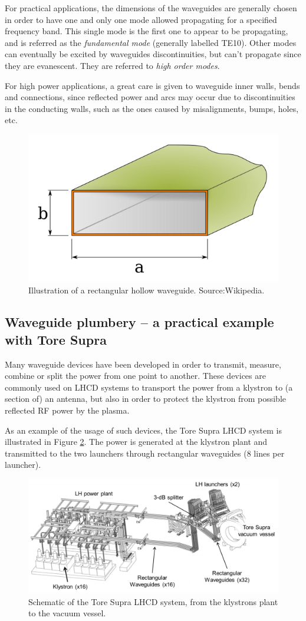 For practical applications, the dimensions of the waveguides are generally chosen in order to have one and only one mode allowed propagating for a specified frequency band. This single mode is the first one to appear to be propagating, and is referred as the \textit{fundamental mode} (generally labelled TE10). Other modes can eventually be excited by waveguides discontinuities, but can’t propagate since they are evanescent. They are referred to \textit{high order modes}.

For high power applications, a great care is given to waveguide inner walls, bends and connections, since reflected power and arcs may occur due to discontinuities in the conducting walls, such as the ones caused by misalignments, bumps, holes, etc.

\begin{figure}
\centering
\includegraphics[width=0.5\linewidth]{Figures/LHCD/Rectangular_Waveguide}
\caption{Illustration of a rectangular hollow waveguide. Source:Wikipedia.}
\label{fig:rectangularwaveguide}
\end{figure}


\subsection{Waveguide plumbery – a practical example with Tore Supra}
Many waveguide devices have been developed in order to transmit, measure, combine or split the power from one point to another. These devices are commonly used on LHCD systems to transport the power from a klystron to (a section of) an antenna, but also in order to protect the klystron from possible reflected RF power by the plasma.   

As an example of the usage of such devices, the Tore Supra LHCD system is illustrated in Figure \ref{fig:toresupralhcdsystem}. The power is generated at the klystron plant and transmitted to the two launchers through rectangular waveguides (8 lines per launcher). 

\begin{figure}
\centering
\includegraphics[width=0.9\linewidth]{Figures/LHCD/ToreSupra_LHCD_System}
\caption{Schematic of the Tore Supra LHCD system, from the klystrons plant to the vacuum vessel.}
\label{fig:toresupralhcdsystem}
\end{figure}



